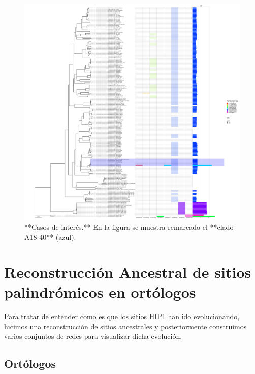 \documentclass[
]{book}
\begin{document}
\begin{figure}

{\centering \includegraphics[width=75in]{figures/pico_165_Octanuc_OE_sel32_filogenia_HIG_cases} 

}

\caption{**Casos de interés.** En la figura se muestra remarcado el **clado A18-40** (azul).}\label{fig:FIG6}
\end{figure}

\hypertarget{reconstrucciuxf3n-ancestral-de-sitios-palindruxf3micos-en-ortuxf3logos}{%
\section{Reconstrucción Ancestral de sitios palindrómicos en ortólogos}\label{reconstrucciuxf3n-ancestral-de-sitios-palindruxf3micos-en-ortuxf3logos}}

Para tratar de entender como es que los sitios HIP1 han ido evolucionando, hicimos una reconstrucción de sitios ancestrales y posteriormente construimos varios conjuntos de redes para visualizar dicha evolución.

\hypertarget{ortuxf3logos}{%
\subsection{Ortólogos}\label{ortuxf3logos}}
\end{document}
